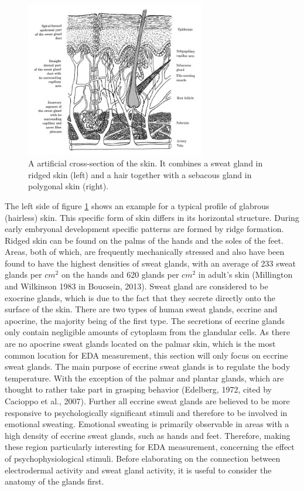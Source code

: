 \begin{figure}[ht]
\centering
\includegraphics[width=0.7\textwidth]{images/skinDermis.png}
\caption{A artificial cross-section of the skin. It combines a sweat gland in ridged skin (left) and a hair together with a sebacous gland in polygonal skin (right).\citep{boucsein2013electrodermal}}
\label{DermisImg}
\end{figure} 

The left side of figure \ref{DermisImg} shows an example for a typical profile of glabrous (hairless) skin. This specific form of skin differs in its horizontal structure. During early embryonal development specific patterns are formed by ridge formation. Ridged skin can be found on the palms of the hands and the soles of the feet. Areas, both of which, are frequently mechanically stressed and also have been found to have the highest densities of sweat glands, with an average of 233 sweat glands per $cm^{2}$ on the hands and 620 glands per $cm^{2}$ in adult's skin (Millington and Wilkinson 1983 in Boucsein, 2013). Sweat gland are considered to be exocrine glands, which is due to the fact that they secrete directly onto the surface of the skin. There are two types of human sweat glands, eccrine and apocrine, the majority being of the first type. The secretions of eccrine glands only contain negligible amounts of cytoplasm from the glandular cells. As there are no apocrine sweat glands located on the palmar skin, which is the most common location for EDA measurement, this section will only focus on eccrine sweat glands. The main purpose of eccrine sweat glands is to regulate the body temperature. With the exception of the palmar and plantar glands, which are thought to rather take part in grasping behavior (Edelberg, 1972, cited by Cacioppo et al., 2007). Further all eccrine sweat glands are believed to be more responsive to psychologically significant stimuli and therefore to be involved in emotional sweating. Emotional sweating is primarily observable in areas with a high density of eccrine sweat glands, such as hands and feet. Therefore, making these region particularly interesting for EDA measurement, concerning the effect of psychophysiological stimuli. Before elaborating on the connection between electrodermal activity and sweat gland activity, it is useful to consider the anatomy of the glands first.


